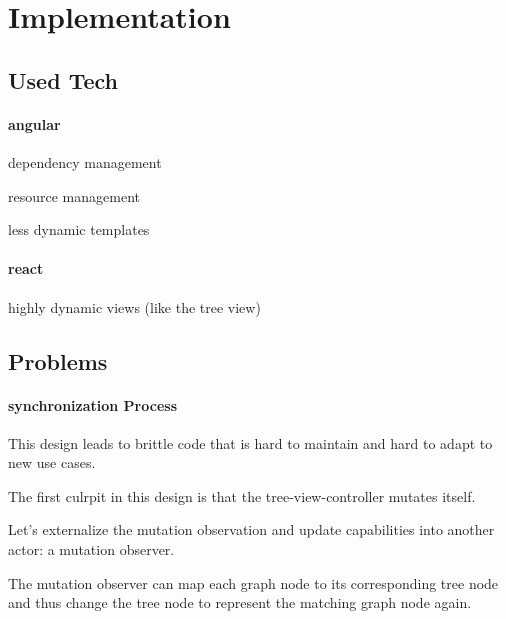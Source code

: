 
\section{Implementation}\label{implementation}

\subsection{Used Tech}\label{used-tech}

\paragraph{angular}\label{angular}

\begin{itemize*}
\item
  dependency management
\item
  resource management
\item
  less dynamic templates
\end{itemize*}

\paragraph{react}\label{react}

\begin{itemize*}
\item
  highly dynamic views (like the tree view)
\end{itemize*}

\subsection{Problems}\label{problems}

\paragraph{synchronization Process}\label{synchronization-process}

This design leads to brittle code that is hard to maintain and hard to
adapt to new use cases.

The first culrpit in this design is that the tree-view-controller
mutates itself.

Let's externalize the mutation observation and update capabilities into
another actor: a mutation observer.

The mutation observer can map each graph node to its corresponding tree
node and thus change the tree node to represent the matching graph node
again.


